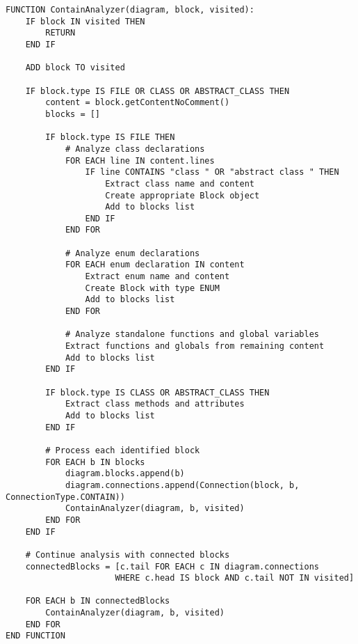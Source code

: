 \begin{lstlisting}[language=pseudocode, caption={$\texttt{ContainAnalyzer}$ function (Pseudocode).}, label={lst:10}]
FUNCTION ContainAnalyzer(diagram, block, visited):
    IF block IN visited THEN
        RETURN
    END IF
    
    ADD block TO visited
    
    IF block.type IS FILE OR CLASS OR ABSTRACT_CLASS THEN
        content = block.getContentNoComment()
        blocks = []
        
        IF block.type IS FILE THEN
            # Analyze class declarations
            FOR EACH line IN content.lines
                IF line CONTAINS "class " OR "abstract class " THEN
                    Extract class name and content
                    Create appropriate Block object
                    Add to blocks list
                END IF
            END FOR
            
            # Analyze enum declarations
            FOR EACH enum declaration IN content
                Extract enum name and content
                Create Block with type ENUM
                Add to blocks list
            END FOR
            
            # Analyze standalone functions and global variables
            Extract functions and globals from remaining content
            Add to blocks list
        END IF
        
        IF block.type IS CLASS OR ABSTRACT_CLASS THEN
            Extract class methods and attributes
            Add to blocks list
        END IF
        
        # Process each identified block
        FOR EACH b IN blocks
            diagram.blocks.append(b)
            diagram.connections.append(Connection(block, b, ConnectionType.CONTAIN))
            ContainAnalyzer(diagram, b, visited)
        END FOR
    END IF
    
    # Continue analysis with connected blocks
    connectedBlocks = [c.tail FOR EACH c IN diagram.connections 
                      WHERE c.head IS block AND c.tail NOT IN visited]
    
    FOR EACH b IN connectedBlocks
        ContainAnalyzer(diagram, b, visited)
    END FOR
END FUNCTION
\end{lstlisting}

